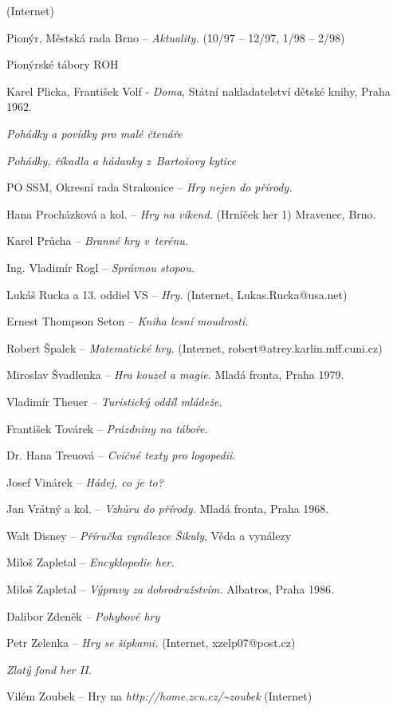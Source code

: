 \begin{multicols}{2}
\begin{list}{[]}{}
  (Internet)
\item Pionýr, Městská rada Brno -- {\it Aktuality.}
  (10/97 -- 12/97, 1/98 -- 2/98)
\item Pionýrské tábory ROH
\item Karel Plicka, František Volf - {\it Doma},
  Státní nakladatelství dětské knihy, Praha 1962.
\item {\it Pohádky a povídky pro malé čtenáře}
\item {\it Pohádky, říkadla a hádanky z~Bartošovy kytice}
\item PO SSM, Okresní rada Strakonice -- {\it Hry nejen do přírody.}
\item Hana Procházková a kol. -- {\it Hry na víkend.} (Hrníček her 1)
  Mravenec, Brno.
\item Karel Průcha -- {\it Branné hry v~terénu.}
\item Ing. Vladimír Rogl -- {\it Správnou stopou.}
\item Lukáš Rucka a 13. oddiel VS -- {\it Hry.}
  (Internet, Lukas.Rucka@usa.net)
\item Ernest Thompson Seton -- {\it Kniha lesní moudrosti.}
\item Robert Špalek -- {\it Matematické hry.}
  (Internet, robert@atrey.karlin.mff.cuni.cz)
\item Miroslav Švadlenka -- {\it Hra kouzel a magie.}
  Mladá fronta, Praha 1979.
\item Vladimír Theuer -- {\it Turistický oddíl mládeže.}
\item František Továrek -- {\it Prázdniny na táboře.}
\item Dr. Hana Treuová -- {\it Cvičné texty pro logopedii.}
\item Josef Vinárek -- {\it Hádej, co je to?}
\item Jan Vrátný a kol. -- {\it Vzhůru do přírody.}
  Mladá fronta, Praha 1968.
\item Walt Disney -- {\it Příručka vynálezce Šikuly}, Věda a vynálezy
\item Miloš Zapletal -- {\it Encyklopedie her.}
\item Miloš Zapletal -- {\it Výpravy za dobrodružstvím.}
  Albatros, Praha 1986.
\item Dalibor Zdeněk -- {\it Pohybové hry}
\item\label{zele1} Petr Zelenka -- {\it Hry se šipkami.}
  (Internet, xzelp07@post.cz)
\item {\it Zlatý fond her II.}
\item Vilém Zoubek -- Hry na {\it http://home.zcu.cz/{\textasciitilde}zoubek}
  (Internet)
  
\end{list}
\end{multicols}

\clearpage

